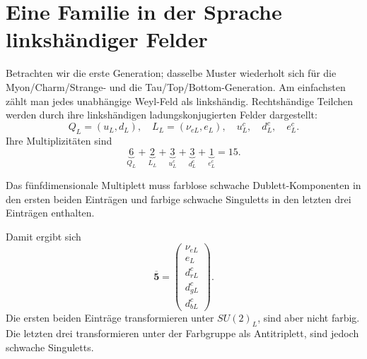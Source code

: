 \section{Eine Familie in der Sprache linkshändiger Felder}

Betrachten wir die erste Generation; dasselbe Muster wiederholt sich für die Myon/Charm/Strange- und die Tau/Top/Bottom-Generation. Am einfachsten zählt man jedes unabhängige Weyl-Feld als linkshändig. Rechtshändige Teilchen werden durch ihre linkshändigen ladungskonjugierten Felder dargestellt:
\begin{equation}
Q_L=(u_L,d_L),\quad
L_L=(\nu_{eL},e_L),\quad
u^c_L,\quad d^c_L,\quad e^c_L.
\end{equation}
Ihre Multiplizitäten sind
\begin{equation}
\underbrace{6}_{Q_L}
+
\underbrace{2}_{L_L}
+
\underbrace{3}_{u^c_L}
+
\underbrace{3}_{d^c_L}
+
\underbrace{1}_{e^c_L}
=15.
\label{eq:l9-fifteen-fields}
\end{equation}


Das fünfdimensionale Multiplett muss farblose schwache Dublett-Komponenten in den ersten beiden Einträgen und farbige schwache Singuletts in den letzten drei Einträgen enthalten.

\begin{classroomqa}
\end{classroomqa}

Damit ergibt sich
\begin{equation}
\overline{\mathbf5}
=
\begin{pmatrix}
\nu_{eL}\\
e_L\\
d^c_{rL}\\
d^c_{gL}\\
d^c_{bL}
\end{pmatrix}.
\label{eq:l9-fivebar}
\end{equation}
Die ersten beiden Einträge transformieren unter \(SU(2)_L\), sind aber nicht farbig. Die letzten drei transformieren unter der Farbgruppe als Antitriplett, sind jedoch schwache Singuletts.

